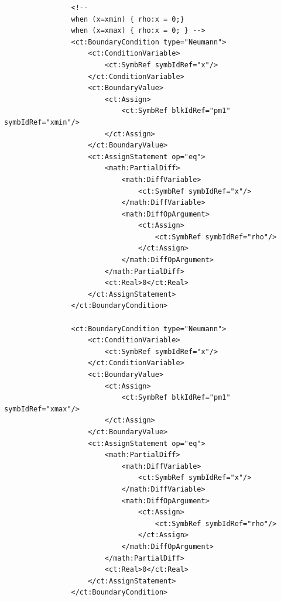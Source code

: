 \lstset{language=XML}
\begin{lstlisting}
                <!--  
                when (x=xmin) { rho:x = 0;} 
                when (x=xmax) { rho:x = 0; } -->
                <ct:BoundaryCondition type="Neumann">
                    <ct:ConditionVariable>
                        <ct:SymbRef symbIdRef="x"/>
                    </ct:ConditionVariable>
                    <ct:BoundaryValue>
                        <ct:Assign>
                            <ct:SymbRef blkIdRef="pm1" symbIdRef="xmin"/>
                        </ct:Assign>
                    </ct:BoundaryValue>
                    <ct:AssignStatement op="eq">
                        <math:PartialDiff>
                            <math:DiffVariable>
                                <ct:SymbRef symbIdRef="x"/>
                            </math:DiffVariable>
                            <math:DiffOpArgument>
                                <ct:Assign>
                                    <ct:SymbRef symbIdRef="rho"/>
                                </ct:Assign>
                            </math:DiffOpArgument>
                        </math:PartialDiff>
                        <ct:Real>0</ct:Real>
                    </ct:AssignStatement>
                </ct:BoundaryCondition>
                
                <ct:BoundaryCondition type="Neumann">
                    <ct:ConditionVariable>
                        <ct:SymbRef symbIdRef="x"/>
                    </ct:ConditionVariable>
                    <ct:BoundaryValue>
                        <ct:Assign>
                            <ct:SymbRef blkIdRef="pm1" symbIdRef="xmax"/>
                        </ct:Assign>
                    </ct:BoundaryValue>
                    <ct:AssignStatement op="eq">
                        <math:PartialDiff>
                            <math:DiffVariable>
                                <ct:SymbRef symbIdRef="x"/>
                            </math:DiffVariable>
                            <math:DiffOpArgument>
                                <ct:Assign>
                                    <ct:SymbRef symbIdRef="rho"/>
                                </ct:Assign>
                            </math:DiffOpArgument>
                        </math:PartialDiff>
                        <ct:Real>0</ct:Real>
                    </ct:AssignStatement>
                </ct:BoundaryCondition>
\end{lstlisting}



\bigskip
